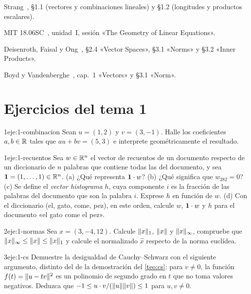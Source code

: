 \begin{lecturas}
\item Strang~\cite{strang}, §1.1 (vectores y combinaciones lineales) y §1.2 (longitudes y productos escalares).
\item MIT 18.06SC~\cite{mit1806sc}, unidad~I, sesión «The Geometry of Linear Equations».
\item Deisenroth, Faisal y Ong~\cite{mml}, §2.4 «Vector Spaces», §3.1 «Norms» y §3.2 «Inner Products».
\item Boyd y Vandenberghe~\cite{vmls}, cap.~1 «Vectors» y §3.1 «Norm».
\end{lecturas}

\section*{Ejercicios del tema 1}

\begin{ejercicio}{1}{eje:1-combinacion}
Sean $u=(1,2)$ y $v=(3,-1)$. Halle los coeficientes $a,b\in\mathbb{R}$ tales que $au+bv=(5,3)$ e interprete geométricamente el resultado.
\end{ejercicio}

\begin{ejercicio}{1}{eje:1-recuentos}
Sea $w\in\mathbb{R}^{n}$ el vector de recuentos de un documento respecto de un diccionario de $n$ palabras que contiene todas las del documento, y sea $\mathbf{1}=(1,\dots,1)\in\mathbb{R}^{n}$. (a) ¿Qué representa $\mathbf{1}\cdot w$? (b) ¿Qué significa que $w_{282}=0$? (c) Se define el \emph{vector histograma} $h$, cuya componente $i$ es la fracción de las palabras del documento que son la palabra $i$. Exprese $h$ en función de $w$. (d) Con el diccionario (el, gato, come, pez), en este orden, calcule $w$, $\mathbf{1}\cdot w$ y $h$ para el documento «el gato come el pez».
\end{ejercicio}

\begin{ejercicio}{2}{eje:1-normas}
Sea $x=(3,-4,12)$. Calcule $\lVert x\rVert_1$, $\lVert x\rVert$ y $\lVert x\rVert_\infty$, compruebe que $\lVert x\rVert_\infty\le\lVert x\rVert\le\lVert x\rVert_1$ y calcule el normalizado $\hat x$ respecto de la norma euclídea.
\end{ejercicio}

\begin{ejercicio}{3}{eje:1-cs}
Demuestre la desigualdad de Cauchy--Schwarz con el siguiente argumento, distinto del de la demostración del \cref{teo:cs}: para $v\neq 0$, la función $f(t)=\lVert u-tv\rVert^{2}$ es un polinomio de segundo grado en $t$ que no toma valores negativos. Deduzca que $-1\le u\cdot v/(\lVert u\rVert\lVert v\rVert)\le 1$ para $u,v\neq 0$.
\end{ejercicio}

